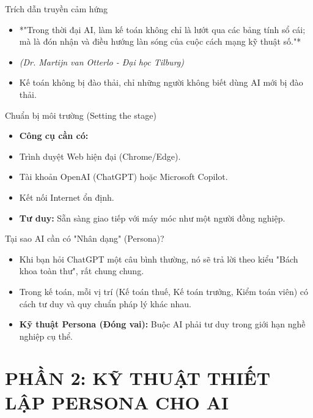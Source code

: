 \documentclass[aspectratio=169]{beamer}
\begin{document}
\begin{frame}{Trích dẫn truyền cảm hứng}
    \begin{itemize}
        \item *"Trong thời đại AI, làm kế toán không chỉ là lướt qua các bảng tính sổ cái; mà là đón nhận và điều hướng làn sóng của cuộc cách mạng kỹ thuật số."*
        \item \textit{(Dr. Martijn van Otterlo - Đại học Tilburg)}
        \item Kế toán không bị đào thải, chỉ những người không biết dùng AI mới bị đào thải.
    \end{itemize}
\end{frame}


\begin{frame}{Chuẩn bị môi trường (Setting the stage)}
    \begin{itemize}
        \item \textbf{Công cụ cần có:}
        \item Trình duyệt Web hiện đại (Chrome/Edge).
        \item Tài khoản OpenAI (ChatGPT) hoặc Microsoft Copilot.
        \item Kết nối Internet ổn định.
        \item \textbf{Tư duy:} Sẵn sàng giao tiếp với máy móc như một người đồng nghiệp.
    \end{itemize}
\end{frame}


\begin{frame}{Tại sao AI cần có "Nhân dạng" (Persona)?}
    \begin{itemize}
        \item Khi bạn hỏi ChatGPT một câu bình thường, nó sẽ trả lời theo kiểu "Bách khoa toàn thư", rất chung chung.
        \item Trong kế toán, mỗi vị trí (Kế toán thuế, Kế toán trưởng, Kiểm toán viên) có cách tư duy và quy chuẩn pháp lý khác nhau.
        \item \textbf{Kỹ thuật Persona (Đóng vai):} Buộc AI phải tư duy trong giới hạn nghề nghiệp cụ thể.
    \end{itemize}
\end{frame}


\section{PHẦN 2: KỸ THUẬT THIẾT LẬP PERSONA CHO AI}
\end{document}
